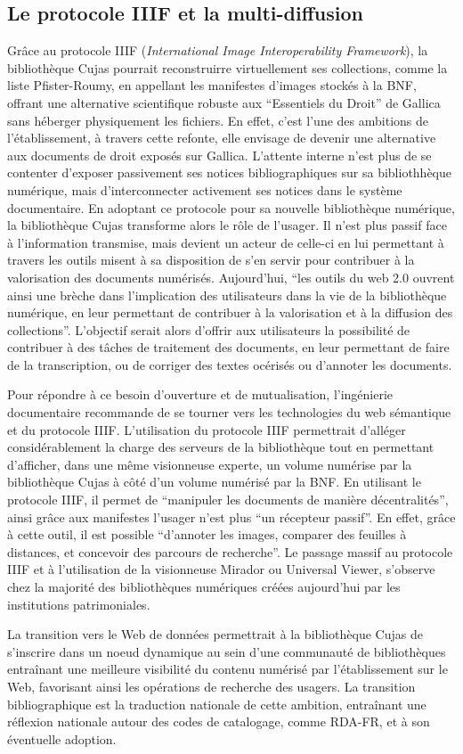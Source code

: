 \subsection{Le protocole IIIF et la multi-diffusion}
Grâce au protocole IIIF (\textit{International Image Interoperability Framework}), la bibliothèque Cujas pourrait reconstruirre virtuellement ses collections, comme la liste Pfister-Roumy, en appellant les manifestes d'images stockés à la BNF, offrant une alternative scientifique robuste aux \enquote{Essentiels du Droit} de Gallica sans héberger physiquement les fichiers. En effet, c'est l'une des ambitions de l'établissement, à travers cette refonte, elle envisage de devenir une alternative aux documents de droit exposés sur Gallica. L'attente interne n'est plus de se contenter d'exposer passivement ses notices bibliographiques sur sa bibliothhèque numérique, mais d'interconnecter activement ses notices dans le système documentaire. En adoptant ce protocole pour sa nouvelle bibliothèque numérique, la bibliothèque Cujas transforme alors le rôle de l'usager. Il n'est plus passif face à l'information transmise, mais devient un acteur de celle-ci en lui permettant à travers les outils misent à sa disposition de s'en servir pour contribuer à la valorisation des documents numérisés. Aujourd'hui, \enquote{les outils du web 2.0 ouvrent ainsi une brèche dans l'implication des utilisateurs dans la vie de la bibliothèque numérique, en leur permettant de contribuer à la valorisation et à la diffusion des collections}. L'objectif serait alors d'offrir aux utilisateurs la possibilité de contribuer à des tâches de traitement des documents, en leur permettant de faire de la transcription, ou de corriger des textes océrisés ou d'annoter les documents.

Pour répondre à ce besoin d'ouverture et de mutualisation, l'ingénierie documentaire recommande de se tourner vers les technologies du web sémantique et du protocole IIIF. L'utilisation du protocole IIIF permettrait d'alléger considérablement la charge des serveurs de la bibliothèque tout en permettant d'afficher, dans une même visionneuse experte, un volume numérise par la bibliothèque Cujas à côté d'un volume numérisé par la BNF. En utilisant le protocole IIIF, il permet de \enquote{manipuler les documents de manière décentralités}, ainsi grâce aux manifestes l'usager n'est plus \enquote{un récepteur passif}. En effet, grâce à cette outil, il est possible \enquote{d'annoter les images, comparer des feuilles à distances, et concevoir des parcours de recherche}. Le passage massif au protocole IIIF et à l'utilisation de la visionneuse Mirador ou Universal Viewer, s'observe chez la majorité des bibliothèques numériques créées aujourd'hui par les institutions patrimoniales. 

La transition vers le Web de données permettrait à la bibliothèque Cujas de s'inscrire dans un noeud dynamique au sein d'une communauté de bibliothèques entraînant une meilleure visibilité du contenu numérisé par l'établissement sur le Web, favorisant ainsi les opérations de recherche des usagers. La transition bibliographique est la traduction nationale de cette ambition, entraînant une réflexion nationale autour des codes de catalogage, comme RDA-FR, et à son éventuelle adoption.